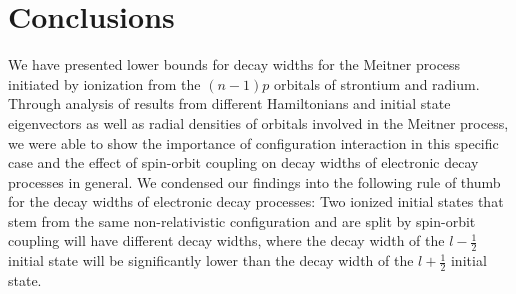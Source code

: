 \section{Conclusions}
\label{section:conclusions}

We have presented lower bounds for
decay widths for the Meitner process initiated by
ionization from the $(n-1)p$ orbitals of strontium and radium.
Through analysis of results from different Hamiltonians and initial state
eigenvectors as well as radial densities of orbitals involved in the
Meitner process, we were able to show the importance of configuration interaction
in this specific case and the effect of spin-orbit coupling on decay widths
of electronic decay processes in general.
We condensed our findings into the following rule of thumb for the decay widths
of electronic decay processes:
Two ionized initial states that stem from the same non-relativistic configuration and
are split by spin-orbit coupling will have different decay widths, where the decay width
of the $l-\frac12$ initial state will be significantly lower than the decay width of
the $l + \frac12$ initial state.
